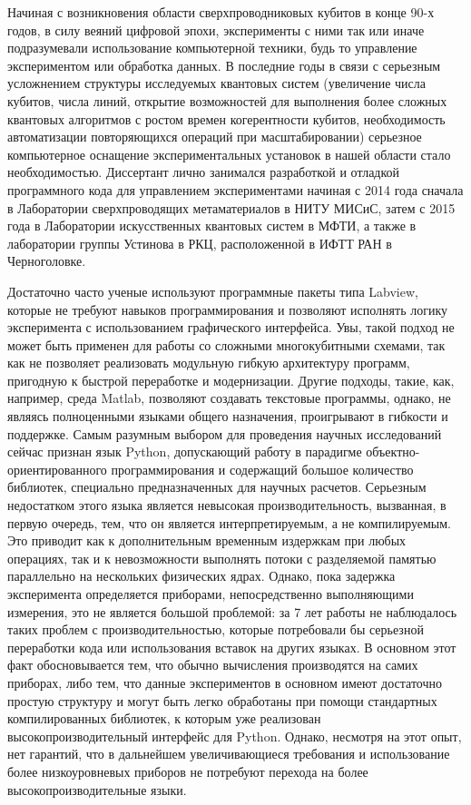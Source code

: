 \documentclass[14pt, a4paper]{extreport}
\numberwithin{equation}{section}
\begin{document}
Начиная с возникновения области сверхпроводниковых кубитов в конце  90-х годов, в силу веяний цифровой эпохи, эксперименты с ними так или иначе подразумевали использование компьютерной техники, будь то управление экспериментом или обработка данных. В последние годы в связи с серьезным усложнением структуры исследуемых квантовых систем (увеличение числа кубитов, числа линий, открытие возможностей для выполнения более сложных квантовых алгоритмов с ростом времен когерентности кубитов, необходимость автоматизации повторяющихся операций при масштабировании) серьезное компьютерное оснащение экспериментальных установок в нашей области стало необходимостью. Диссертант лично занимался разработкой и отладкой программного кода для управлением экспериментами начиная с 2014 года сначала в Лаборатории сверхпроводящих метаматериалов в НИТУ МИСиС, затем с 2015 года в Лаборатории искусственных квантовых систем в МФТИ, а также в лаборатории группы Устинова в РКЦ, расположенной в ИФТТ РАН в Черноголовке. 

Достаточно часто ученые используют программные пакеты типа Labview, которые не требуют навыков программирования и позволяют исполнять логику эксперимента с использованием графического интерфейса. Увы, такой подход не может быть применен для работы со сложными многокубитными схемами, так как не позволяет реализовать модульную гибкую архитектуру программ, пригодную к быстрой переработке и модернизации. Другие подходы, такие, как, например, среда Matlab, позволяют создавать текстовые программы, однако, не являясь полноценными языками общего назначения, проигрывают в гибкости и поддержке. Самым разумным выбором для проведения научных исследований сейчас признан язык Python, допускающий работу в парадигме объектно-ориентированного программирования и содержащий большое количество библиотек, специально предназначенных для научных расчетов. Серьезным недостатком этого языка является невысокая производительность, вызванная, в первую очередь, тем, что он является интерпретируемым, а не компилируемым. Это приводит как к дополнительным временным издержкам при любых операциях, так и к невозможности выполнять потоки с разделяемой памятью параллельно на нескольких физических ядрах. Однако, пока задержка эксперимента определяется приборами, непосредственно выполняющими измерения, это не является большой проблемой: за 7 лет работы не наблюдалось таких проблем с производительностью, которые потребовали бы серьезной переработки кода или использования вставок на других языках. В основном этот факт обосновывается тем, что обычно вычисления производятся на самих приборах, либо тем, что данные экспериментов в основном имеют достаточно простую структуру и могут быть легко обработаны при помощи стандартных компилированных библиотек, к которым уже реализован высокопроизводительный интерфейс для Python. Однако, несмотря на этот опыт, нет гарантий, что в дальнейшем увеличивающиеся требования и использование более низкоуровневых приборов не потребуют перехода на более высокопроизводительные языки.
\end{document}
